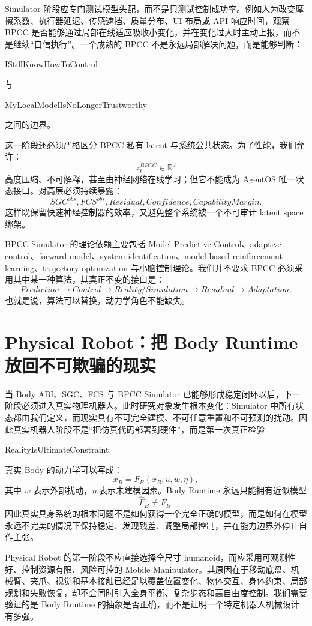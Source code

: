 Simulator 阶段应专门测试模型失配，而不是只测试控制成功率。例如人为改变摩擦系数、执行器延迟、传感遮挡、质量分布、UI 布局或 API 响应时间，观察 BPCC 是否能够通过局部在线适应吸收小变化，并在变化过大时主动上报，而不是继续“自信执行”。一个成熟的 BPCC 不是永远局部解决问题，而是能够判断：
\begin{statementbox}
IStillKnowHowToControl
\end{statementbox}
与
\begin{statementbox}
MyLocalModelIsNoLongerTrustworthy
\end{statementbox}
之间的边界。

这一阶段还必须严格区分 BPCC 私有 latent 与系统公共状态。为了性能，我们允许：
\[
z_t^{BPCC}\in\mathbb R^d
\]
高度压缩、不可解释，甚至由神经网络在线学习；但它不能成为 AgentOS 唯一状态接口。对高层必须持续暴露：
\[
SGC^{obs},
FCS^{obs},
Residual,
Confidence,
CapabilityMargin.
\]
这样既保留快速神经控制器的效率，又避免整个系统被一个不可审计 latent space 绑架。

BPCC Simulator 的理论依赖主要包括 Model Predictive Control、adaptive control、forward model、system identification、model-based reinforcement learning、trajectory optimization 与小脑控制理论。我们并不要求 BPCC 必须采用其中某一种算法，其真正不变的接口是：
\[
Prediction
\rightarrow
Control
\rightarrow
Reality/Simulation
\rightarrow
Residual
\rightarrow
Adaptation.
\]
也就是说，算法可以替换，动力学角色不能缺失。

\section{Physical Robot：把 Body Runtime 放回不可欺骗的现实}

当 Body ABI、SGC、FCS 与 BPCC Simulator 已能够形成稳定闭环以后，下一阶段必须进入真实物理机器人。此时研究对象发生根本变化：Simulator 中所有状态都由我们定义，而现实具有不可完全建模、不可任意重置和不可预测的扰动。因此真实机器人阶段不是“把仿真代码部署到硬件”，而是第一次真正检验
\begin{statementbox}
RealityIsUltimateConstraint.
\end{statementbox}

真实 Body 的动力学可以写成：
\[
\dot x_B
=
F_B(x_B,u,w,\eta),
\]
其中 $w$ 表示外部扰动，$\eta$ 表示未建模因素。Body Runtime 永远只能拥有近似模型
\[
\hat F_B\neq F_B.
\]
因此真实具身系统的根本问题不是如何获得一个完全正确的模型，而是如何在模型永远不完美的情况下保持稳定、发现残差、调整局部控制，并在能力边界外停止自作主张。

Physical Robot 的第一阶段不应直接选择全尺寸 humanoid，而应采用可观测性好、控制资源有限、风险可控的 Mobile Manipulator。其原因在于移动底盘、机械臂、夹爪、视觉和基本接触已经足以覆盖位置变化、物体交互、身体约束、局部规划和失败恢复，却不会同时引入全身平衡、复杂步态和高自由度控制。我们需要验证的是 Body Runtime 的抽象是否正确，而不是证明一个特定机器人机械设计有多强。

